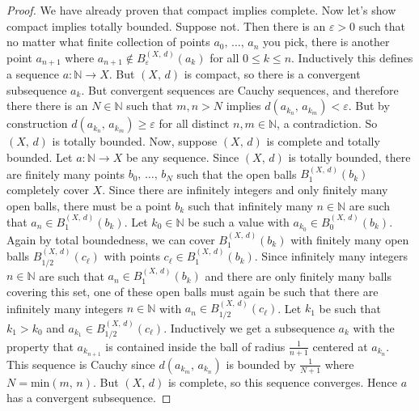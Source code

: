 \documentclass{article}
\theoremstyle{plain}
\theoremstyle{normal}
\begin{document}
        \begin{proof}
            We have already proven that compact implies complete. Now let's
            show compact implies totally bounded. Suppose not. Then there is
            an $\varepsilon>0$ such that no matter what finite collection of
            points $a_{0},\,\dots,\,a_{n}$ you pick, there is another point
            $a_{n+1}$ where $a_{n+1}\notin{B}_{\varepsilon}^{(X,\,d)}(a_{k})$
            for all $0\leq{k}\leq{n}$. Inductively this defines a sequence
            $a:\mathbb{N}\rightarrow{X}$. But $(X,\,d)$ is compact, so there
            is a convergent subsequence $a_{k}$. But convergent sequences are
            Cauchy sequences, and therefore there there is an
            $N\in\mathbb{N}$ such that $m,n>N$ implies
            $d(a_{k_{n}},\,a_{k_{m}})<\varepsilon$. But by construction
            $d(a_{k_{n}},\,a_{k_{m}})\geq\varepsilon$ for all distinct
            $n,m\in\mathbb{N}$, a contradiction.
            So $(X,\,d)$ is totally bounded.
            Now, suppose $(X,\,d)$ is complete and totally bounded. Let
            $a:\mathbb{N}\rightarrow{X}$ be any sequence. Since
            $(X,\,d)$ is totally bounded, there are finitely many points
            $b_{0},\,\dots,\,b_{N}$ such that the open balls
            $B_{1}^{(X,\,d)}(b_{k})$ completely cover $X$. Since there are
            infinitely integers and only finitely many open balls, there
            must be a point $b_{k}$ such that infinitely many $n\in\mathbb{N}$
            are such that $a_{n}\in{B}_{1}^{(X,\,d)}(b_{k})$. Let
            $k_{0}\in\mathbb{N}$ be such a value
            with $a_{k_{0}}\in{B}_{0}^{(X,\,d)}(b_{k})$. Again by total
            boundedness, we can cover $B_{1}^{(X,\,d)}(b_{k})$ with finitely
            many open balls $B_{1/2}^{(X,\,d)}(c_{\ell})$ with points
            $c_{\ell}\in{B}_{1}^{(X,\,d)}(b_{k})$. Since infinitely many integers
            $n\in\mathbb{N}$ are such that $a_{n}\in{B}_{1}^{(X,\,d)}(b_{k})$
            and there are only finitely many balls covering this set,
            one of these open balls must again be such that there are
            infinitely many integers $n\in\mathbb{N}$ with
            $a_{n}\in{B}_{1/2}^{(X,\,d)}(c_{\ell})$. Let
            $k_{1}$ be such that $k_{1}>k_{0}$ and
            $a_{k_{1}}\in{B}_{1/2}^{(X,\,d)}(c_{\ell})$. Inductively
            we get a subsequence $a_{k}$ with the property that
            $a_{k_{n+1}}$ is contained inside the ball of radius
            $\frac{1}{n+1}$ centered at $a_{k_{n}}$. This sequence is
            Cauchy since $d(a_{k_{m}},\,a_{k_{n}})$ is bounded by
            $\frac{1}{N+1}$ where $N=\textrm{min}(m,\,n)$. But $(X,\,d)$ is
            complete, so this sequence
            converges. Hence $a$ has a convergent subsequence.
        \end{proof}
\end{document}

